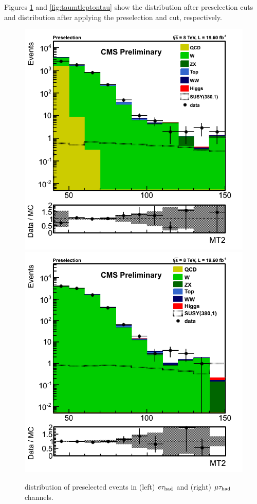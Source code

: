 Figures \ref{fig:mt2leptontau} and \ref{fig:taumtleptontau} show the \mttwo distribution after preselection cuts and  \tauMT 
distribution after applying the preselection and \mttwo cut, respectively.
\begin{figure}[!Hhtb]
\centering
\includegraphics[angle=0,scale=0.35]{SelectionEleTau/MT2.png}
\includegraphics[angle=0,scale=0.35]{SelectionMuTau/MT2_Ratio_Preselection_unBlinded.png}
\caption{\mttwo distribution of preselected events in (left) $e\tau_{\rm had}$ and (right) $\mu\tau_{\rm had}$ channels.}
\label{fig:mt2leptontau}
\end{figure}


